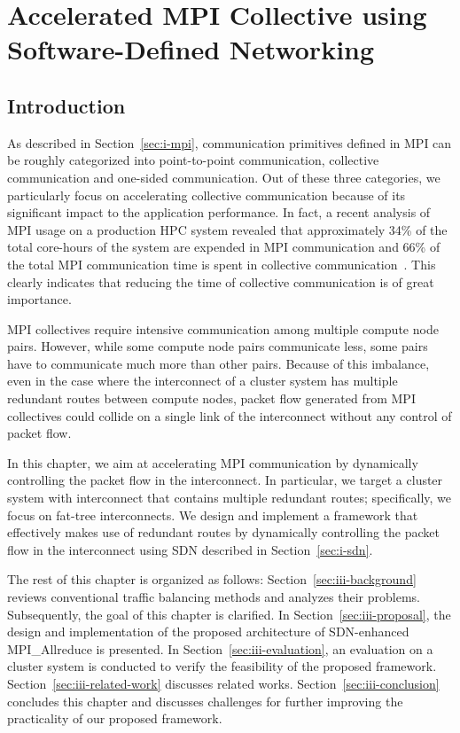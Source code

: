 \chapter{Accelerated MPI Collective using Software-Defined Networking}\label{sec:iii}

\section{Introduction}\label{sec:iii-introduction}

As described in Section~\ref{sec:i-mpi}, communication primitives defined in
MPI can be roughly categorized into point-to-point communication, collective
communication and one-sided communication. Out of these three categories, we
particularly focus on accelerating collective communication because of its
significant impact to the application performance. In fact, a recent analysis
of MPI usage on a production HPC system revealed that approximately 34\% of
the total core-hours of the system are expended in MPI communication and 66\%
of the total MPI communication time is spent in collective
communication~\autocite{Chunduri2018}. This clearly indicates that reducing
the time of collective communication is of great importance.

MPI collectives require intensive communication among multiple compute node
pairs. However, while some compute node pairs communicate less, some pairs
have to communicate much more than other pairs. Because of this imbalance,
even in the case where the interconnect of a cluster system has multiple
redundant routes between compute nodes, packet flow generated from MPI
collectives could collide on a single link of the interconnect without any
control of packet flow.

In this chapter, we aim at accelerating MPI communication by dynamically
controlling the packet flow in the interconnect. In particular, we target a
cluster system with interconnect that contains multiple redundant routes;
specifically, we focus on fat-tree interconnects. We design and implement a
framework that effectively makes use of redundant routes by dynamically
controlling the packet flow in the interconnect using SDN described in
Section~\ref{sec:i-sdn}.

The rest of this chapter is organized as follows:
Section~\ref{sec:iii-background} reviews conventional traffic balancing
methods and analyzes their problems. Subsequently, the goal of this chapter is
clarified. In Section~\ref{sec:iii-proposal}, the design and implementation of
the proposed architecture of SDN-enhanced MPI\_Allreduce is presented. In
Section~\ref{sec:iii-evaluation}, an evaluation on a cluster system is
conducted to verify the feasibility of the proposed framework.
Section~\ref{sec:iii-related-work} discusses related works.
Section~\ref{sec:iii-conclusion} concludes this chapter and discusses
challenges for further improving the practicality of our proposed framework.

